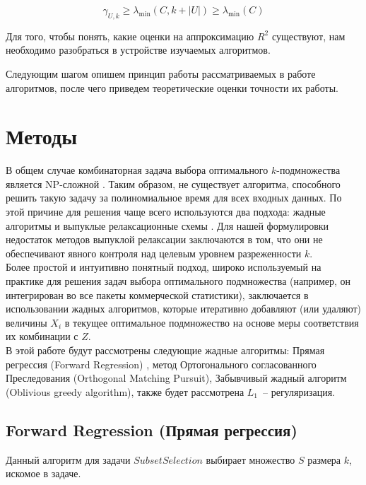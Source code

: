 \documentclass[preprint,12pt]{elsarticle}
\begin{document}
\begin{lemma}
\[\gamma_{U, k} \geq \lambda_{\min }(C, k+|U|) \geq \lambda_{\min }(C)\]
\end{lemma}


Для того, чтобы понять, какие оценки на аппроксимацию $R^2$ существуют, нам необходимо разобраться в устройстве изучаемых алгоритмов.

Следующим шагом опишем принцип работы рассматриваемых в работе алгоритмов, после чего приведем теоретические оценки точности их работы.

\section{Методы}
\label{S:3}
В общем случае комбинаторная задача выбора оптимального $k$-подмножества является NP-сложной \cite{das2011submodular}. Таким образом, не существует алгоритма, способного решить такую задачу за полиномиальное время для всех входных данных. По этой причине для решения чаще всего используются два подхода: жадные алгоритмы \cite{miller2002subset, tropp2004greed, gilbert2003approximation} и выпуклые релаксационные схемы \cite{obozinski2012convex, tibshirani1996regression, candes2006stable}. Для нашей формулировки недостаток методов выпуклой релаксации заключаются в том, что они не обеспечивают явного контроля над целевым уровнем разреженности $k$.\\

Более простой и интуитивно понятный подход, широко используемый на практике для решения задач выбора оптимального подмножества (например, он интегрирован во все пакеты коммерческой статистики), заключается в использовании жадных алгоритмов, которые итеративно добавляют (или удаляют) величины $X_i$ в текущее оптимальное подмножество на основе меры соответствия их комбинации с $Z$.\\

В этой работе будут рассмотрены следующие жадные алгоритмы: Прямая регрессия (Forward Regression) \cite{miller2002subset}, метод Ортогонального согласованного Преследования (Orthogonal Matching Pursuit)\cite{tropp2004greed}, Забывчивый жадный алгоритм (Oblivious greedy algorithm), также будет рассмотрена $L_1$~-- регуляризация.

\subsection{Forward Regression (Прямая регрессия)}
Данный алгоритм для задачи $Subset Selection$ выбирает множество $S$ размера $k$, искомое в задаче. 
\end{document}
